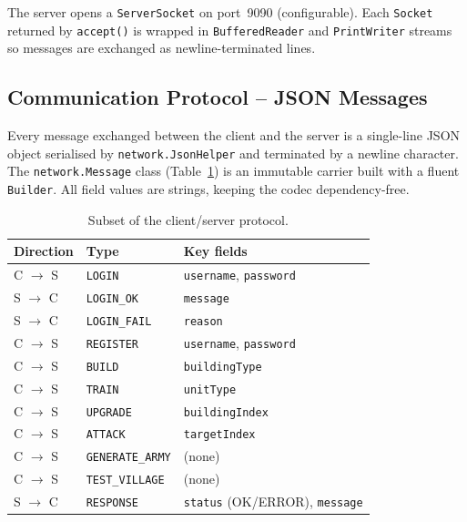 \documentclass[format=acmsmall, review=false, screen=true]{acmart}
\begin{document}
The server opens a \texttt{ServerSocket} on port~9090 (configurable).  Each
\texttt{Socket} returned by \texttt{accept()} is wrapped in \texttt{BufferedReader}
and \texttt{PrintWriter} streams so messages are exchanged as newline-terminated
lines.

\subsection{Communication Protocol -- JSON Messages}

Every message exchanged between the client and the server is a single-line JSON
object serialised by \texttt{network.JsonHelper} and terminated by a newline
character.  The \texttt{network.Message} class (Table~\ref{tbl:protocol}) is an
immutable carrier built with a fluent \texttt{Builder}.  All field values are
strings, keeping the codec dependency-free.

\begin{table}[h]
  \centering
  \caption{Subset of the client/server protocol.}
  \label{tbl:protocol}
  \begin{tabularx}{\linewidth}{llX}
    \toprule
    \textbf{Direction} & \textbf{Type} & \textbf{Key fields} \\
    \midrule
    C $\to$ S & \texttt{LOGIN}         & \texttt{username}, \texttt{password} \\
    S $\to$ C & \texttt{LOGIN\_OK}     & \texttt{message} \\
    S $\to$ C & \texttt{LOGIN\_FAIL}   & \texttt{reason} \\
    C $\to$ S & \texttt{REGISTER}      & \texttt{username}, \texttt{password} \\
    C $\to$ S & \texttt{BUILD}         & \texttt{buildingType} \\
    C $\to$ S & \texttt{TRAIN}         & \texttt{unitType} \\
    C $\to$ S & \texttt{UPGRADE}       & \texttt{buildingIndex} \\
    C $\to$ S & \texttt{ATTACK}        & \texttt{targetIndex} \\
    C $\to$ S & \texttt{GENERATE\_ARMY} & (none) \\
    C $\to$ S & \texttt{TEST\_VILLAGE} & (none) \\
    S $\to$ C & \texttt{RESPONSE}      & \texttt{status} (OK/ERROR), \texttt{message} \\
    \bottomrule
  \end{tabularx}
\end{table}
\end{document}
